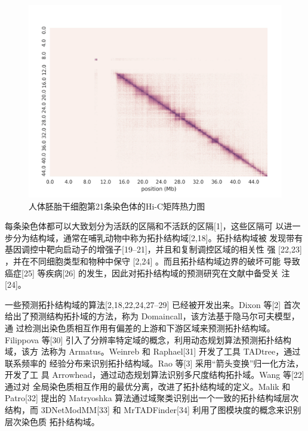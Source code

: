 \documentclass[a4paper]{apa6}
\begin{document}
\begin{figure}[htbp]
\centering
\includegraphics[width=.9\linewidth]{./asset/hic-heatmap.png}
\caption{\label{fig:hic-heatmap}人体胚胎干细胞第21条染色体的Hi-C矩阵热力图}
\end{figure}

每条染色体都可以大致划分为活跃的区隔和不活跃的区隔[1]，这些区隔可
以进一步分为结构域，通常在哺乳动物中称为拓扑结构域[2,18]。拓扑结构域被
发现带有基因调控中靶向启动子的增强子[19–21]，并且和复制调控区域的相关性
强 [22,23] ，并在不同细胞类型和物种中保守 [2,24] 。而且拓扑结构域边界的破坏可能
导致癌症[25] 等疾病[26] 的发生，因此对拓扑结构域的预测研究在文献中备受关 注[24]。

一些预测拓扑结构域的算法[2,18,22,24,27–29] 已经被开发出来。Dixon 等[2] 首次 给出了预测结构拓扑域的方法，称为 Domaincall，该方法基于隐马尔可夫模型，通 过检测出染色质相互作用有偏差的上游和下游区域来预测拓扑结构域。Filippova 等[30] 引入了分辨率特定域的概念，利用动态规划算法预测拓扑结构域，该方 法称为 Armatus。Weinreb 和 Raphael[31] 开发了工具 TADtree，通过联系频率的 经验分布来识别拓扑结构域。Rao 等[3] 采用“箭头变换”归一化方法，开发了工 具 Arrowhead，通过动态规划算法识别多尺度结构拓扑域。Wang 等[22] 通过对 全局染色质相互作用的最优分离，改进了拓扑结构域的定义。Malik 和 Patro[32] 提出的 Matryoshka 算法通过域聚类识别出一个一致的拓扑结构域层次结构，而 3DNetModMM[33] 和 MrTADFinder[34] 利用了图模块度的概念来识别层次染色质 拓扑结构域。
\end{document}
